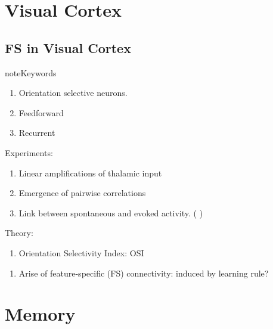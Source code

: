\documentclass[letterpaper,10pt,english]{sphinxmanual}
\begin{document}
\section{Visual Cortex}
\label{\detokenize{neuroscience/visual-cortex::doc}}\label{\detokenize{neuroscience/visual-cortex:visual-cortex}}

\subsection{FS in Visual Cortex}
\label{\detokenize{neuroscience/visual-cortex:fs-in-visual-cortex}}
\begin{sphinxadmonition}{note}{Keywords}
\begin{enumerate}
\item {} 
Orientation selective neurons.

\item {} 
Feedforward

\item {} 
Recurrent

\end{enumerate}

Experiments:
\begin{enumerate}
\item {} 
Linear amplifications of thalamic input

\item {} 
Emergence of pairwise correlations

\item {} 
Link between spontaneous and evoked activity. ( {\hyperref[\detokenize{neuroscience/misc:resting-state-networks}]{}} )

\end{enumerate}

Theory:
\begin{enumerate}
\item {} 
Orientation Selectivity Index: OSI

\end{enumerate}
\end{sphinxadmonition}
\begin{enumerate}
\item {} 
Arise of feature-specific (FS) connectivity: induced by learning rule?

\end{enumerate}


\section{Memory}
\label{\detokenize{neuroscience/memory/index::doc}}\label{\detokenize{neuroscience/memory/index:memory}}
\end{document}
